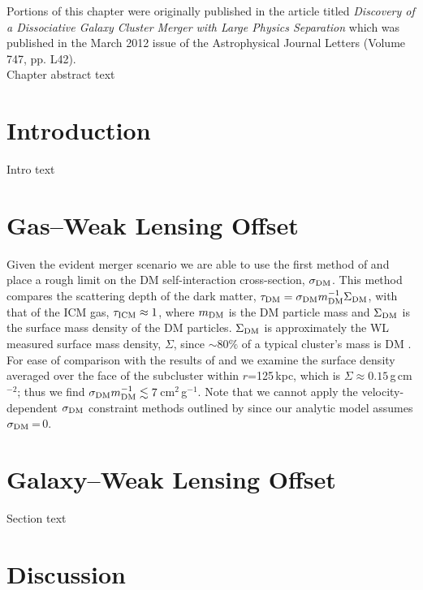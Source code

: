 \label{chapter:4}

\noindent Portions of this chapter were originally published in the article titled \emph{Discovery of a Dissociative Galaxy Cluster Merger with Large Physics Separation} which was published in the March 2012 issue of the Astrophysical Journal Letters (Volume 747, pp. L42). \\

Chapter abstract text

\section{Introduction}

Intro text \citep{Dawson:2012dl}

\section{Gas--Weak Lensing Offset}

Given the evident merger scenario we are able to use the first method of \citet{mark04} and place a rough limit on the DM self-interaction cross-section, $\sigma_{\rm DM}$.
This method compares the scattering depth of the dark matter, $\tau_{\rm DM}=\sigma_{\rm DM}m^{-1}_{\rm DM} \Sigma_{\rm DM}$, with that of the ICM gas, $\tau_{\rm ICM}\approx 1$, where $m_{\rm DM}$ is the DM particle mass and $\Sigma_{\rm DM}$ is the surface mass density of the DM particles.
$\Sigma_{\rm DM}$ is approximately the WL measured surface mass density, $\Sigma$, since $\sim80\%$ of a typical cluster's mass is DM \citep{diaf08}.
For ease of comparison with the results of \citet{mark04} and \citet{mert11} we examine the surface density averaged over the face of the subcluster within $r$=125\,kpc, which is $\Sigma\approx0.15$\,g\,cm$^{-2}$; thus we find $\sigma_{\rm DM} m_{\rm DM}^{-1} \lesssim 7$\,cm$^2$\,g$^{-1}$.  Note that we cannot apply the velocity-dependent $\sigma_{\rm DM}$ constraint methods outlined by \citet{mark04} since our analytic model assumes $\sigma_{\rm DM}$\,=\,0.

\section{Galaxy--Weak Lensing Offset}

Section text

\section{Discussion}

